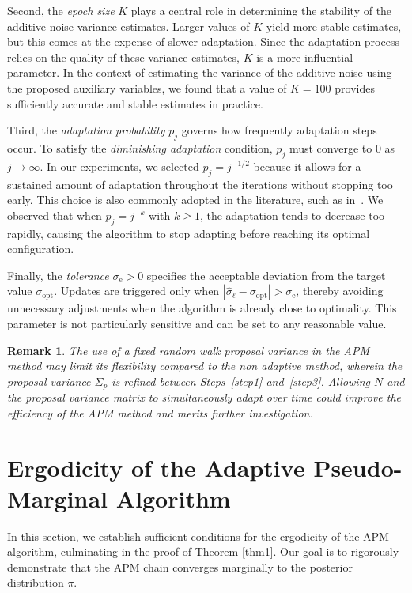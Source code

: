 \documentclass[pdflatex,sn-mathphys-num]{sn-jnl}
\renewcommand{\geq}{\geqslant}
\theoremstyle{thmstyleone}
\theoremstyle{thmstyletwo}
\newtheorem{remark}{Remark}
\theoremstyle{thmstylethree}
\begin{document}
Second, the \textit{epoch size} $K$ plays a central role in determining the stability of the additive noise variance estimates. 
Larger values of $K$ yield more stable estimates, but this comes at the expense of slower adaptation. 
Since the adaptation process relies on the quality of these variance estimates, $K$ is a more influential parameter. 
In the context of estimating the variance of the additive noise using the proposed auxiliary variables, we found that a value of $K=100$ provides sufficiently accurate and stable estimates in practice. 

Third, the \textit{adaptation probability} $p_j$ governs how frequently adaptation steps occur. To satisfy the \textit{diminishing adaptation} condition, $p_j$ must converge to $0$ as $j \to \infty$. 
In our experiments, we selected $p_j = j^{-1/2}$ because it allows for a sustained amount of adaptation throughout the iterations without stopping too early. 
This choice is also commonly adopted in the literature, such as in~\cite{roberts_examples_2009}. 
We observed that when $p_j = j^{-k}$ with $k \geq 1$, the adaptation tends to decrease too rapidly, causing the algorithm to stop adapting before reaching its optimal configuration.

Finally, the \textit{tolerance} $\sigma_\text{e} > 0$ specifies the acceptable deviation from the target value $\sigma_{\text{opt}}$. Updates are triggered only when $|\hat{\sigma}_\ell - \sigma_{\text{opt}}| > \sigma_\text{e}$, thereby avoiding unnecessary adjustments when the algorithm is already close to optimality. This parameter is not particularly sensitive and can be set to any reasonable value.

\begin{remark}
    The use of a fixed random walk proposal variance in the APM method may limit its flexibility compared to the non adaptive method, wherein the proposal variance $\Sigma_p$ is refined between Steps~\ref{step1} and~\ref{step3}. Allowing $N$ and the proposal variance matrix to simultaneously adapt over time could improve the efficiency of the APM method and merits further investigation.
\end{remark}

\section{Ergodicity of the Adaptive Pseudo-Marginal Algorithm}
\label{sec:APMproof}
In this section, we establish sufficient conditions for the ergodicity of the APM algorithm, culminating in the proof of Theorem \ref{thm1}. Our goal is to rigorously demonstrate that the APM chain converges marginally to the posterior distribution $\pi$.
\end{document}
